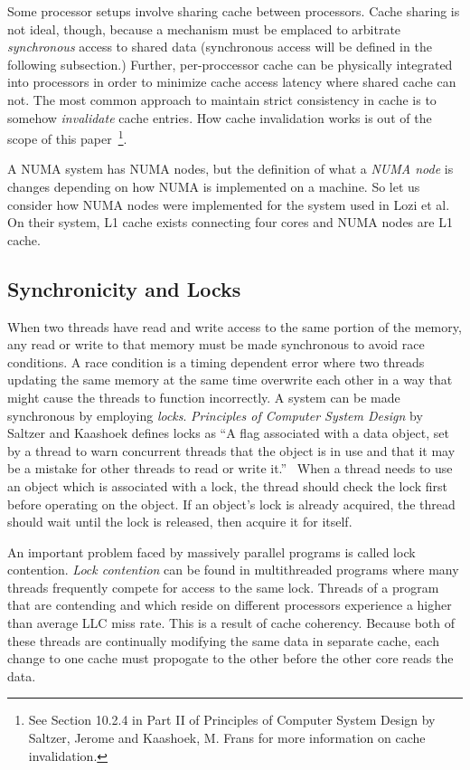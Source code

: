 \documentclass{sig-alternate}
\begin{document}
Some processor setups involve sharing cache between processors. Cache sharing is not ideal, though, because a mechanism must be emplaced to arbitrate \emph{synchronous} access to shared data (synchronous access will be defined in the following subsection.) Further, per-proccessor cache can be physically integrated into processors in order to minimize cache access latency where shared cache can not. The most common approach to maintain strict consistency in cache is to somehow \emph{invalidate} cache entries. How cache invalidation works is out of the scope of this paper~\footnote{See Section 10.2.4 in Part II of Principles of Computer System Design by Saltzer, Jerome and Kaashoek, M. Frans for more information on cache invalidation.}.~\cite{Systems}

A NUMA system has NUMA nodes, but the definition of what a \emph{NUMA node} is changes depending on how NUMA is implemented on a machine. So let us consider how NUMA nodes were implemented for the system used in Lozi et al. On their system, L1 cache exists connecting four cores and NUMA nodes are L1 cache.

\subsection{Synchronicity and Locks}
\label{sec:locks}

When two threads have read and write access to the same portion of the memory, any read or write to that memory must be made synchronous to avoid race conditions. A race condition is a timing dependent error where two threads updating the same memory at the same time overwrite each other in a way that might cause the threads to function incorrectly. A system can be made synchronous by employing \emph{locks}. \textit{Principles of Computer System Design} by Saltzer and Kaashoek defines locks as ``A flag associated with a data object, set by a thread to warn concurrent threads that the object is in use and that it may be a mistake for other threads to read or write it.''~\cite{Systems}
When a thread needs to use an object which is associated with a lock, the thread should check the lock first before operating on the object. If an object's lock is already acquired, the thread should wait until the lock is released, then acquire it for itself.

An important problem faced by massively parallel programs is called lock contention. \emph{Lock contention} can be found in multithreaded programs where many threads frequently compete for access to the same lock. Threads of a program that are contending and which reside on different processors experience a higher than average LLC miss rate. This is a result of cache coherency. Because both of these threads are continually modifying the same data in separate cache, each change to one cache must propogate to the other before the other core reads the data.
\end{document}
